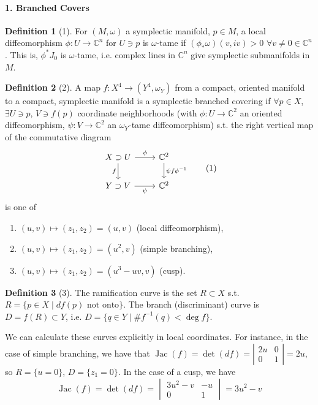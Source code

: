 \documentclass[UTF8,11pt]{ctexart}
\theoremstyle{definition}
\newtheorem*{definition}{Definition}
\newcommand{\C}{\mathbb C}
\begin{document}
\paragraph{1. Branched Covers}
\begin{definition}[1]
For $(M,\omega)$ a symplectic manifold, $p\in M$, a local diffeomorphism $\phi:U\to\C^n$ for $U\ni p$ is $\omega$-tame if $(\phi_*\omega)(v,iv)>0$ $\forall v\ne0\in\C^n$. This is, $\phi^*J_0$ is $\omega$-tame, i.e. complex lines in $\C^n$ give symplectic submanifolds in $M$.
\end{definition}
\begin{definition}[2]
A map $f:X^4\to(Y^4,\omega_Y)$ from a compact, oriented manifold to a compact, symplectic manifold is a symplectic branched covering if $\forall p\in X$, $\exists U\ni p$, $V\ni f(p)$ coordinate neighborhoods (with $\phi:U\to\C^2$ an oriented diffeomorphism, $\psi:V\to\C^2$ an $\omega_Y$-tame diffeomorphism) s.t. the right vertical map of the commutative diagram
\[
\begin{tikzcd}
X\supset U\arrow[r,"\phi"]\arrow[d,"f"']&\C^2\arrow[d,"\psi f\phi^{-1}"]\\
Y\supset V\arrow[r,"\psi"']&\C^2
\end{tikzcd}\tag{1}
\]
is one of
\begin{enumerate}
\item $(u,v)\mapsto(z_1,z_2)=(u,v)$ (local diffeomorphism),
\item $(u,v)\mapsto(z_1,z_2)=(u^2,v)$ (simple branching),
\item $(u,v)\mapsto(z_1,z_2)=(u^3-uv,v)$ (cusp).
\end{enumerate}
\end{definition}
\begin{definition}[3]
The ramification curve is the set $R\subset X$ s.t. $R=\{p\in X\mid df(p)\text{ not onto}\}$. The branch (discriminant) curve is $D=f(R)\subset Y$, i.e. $D=\{q\in Y\mid\#f^{-1}(q)<\deg f\}$.
\end{definition}
We can calculate these curves explicitly in local coordinates. For instance, in the case of simple branching, we have that $\operatorname{Jac}(f)=\det(df)=\left|\begin{smallmatrix}2u&0\\0&1\end{smallmatrix}\right|=2u$, so $R=\{u=0\}$, $D=\{z_1=0\}$. In the case of a cusp, we have
\[
\operatorname{Jac}(f)=\det(df)=\begin{vmatrix}3u^2-v&-u\\0&1\end{vmatrix}=3u^2-v\tag{2}
\]
\end{document}
